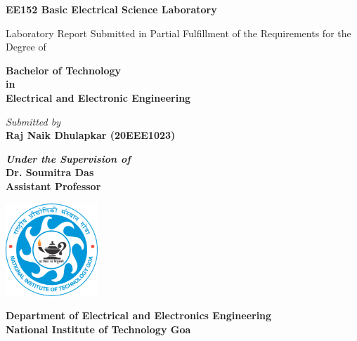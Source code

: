 \begin{titlepage}
    \begin{center}

        \huge {\textbf{EE152 Basic Electrical Science Laboratory}}
        \vspace{1cm}

        {\footnotesize Laboratory Report Submitted in Partial Fulfillment of the Requirements for the Degree of}\\
        \vspace{1cm}

        \textbf{\Large Bachelor of Technology}\\
        \textbf{\Large{in}}\\
        \textbf{\Large Electrical and Electronic Engineering}
        \vspace{1cm}

        \textit{Submitted by}\\
        \textbf{\large Raj Naik Dhulapkar  (20EEE1023)}\\
        \vspace{1cm}

        \centering \large \textbf{\textit{Under the Supervision of}}\\
        \textbf{\large Dr. Soumitra Das}\\
        \centering\textbf{Assistant Professor}
        \vspace{2cm}

        \includegraphics[width=0.26\textwidth]{images/NIT_Goa_Logo.png}\\
        \vspace{2cm}

        \textbf{Department of Electrical and Electronics Engineering}\\
        \vspace{0.1cm}
        \textbf{National Institute of Technology Goa}\\
        \vspace{0.3cm}
        \textbf{}

    \end{center}
\end{titlepage}